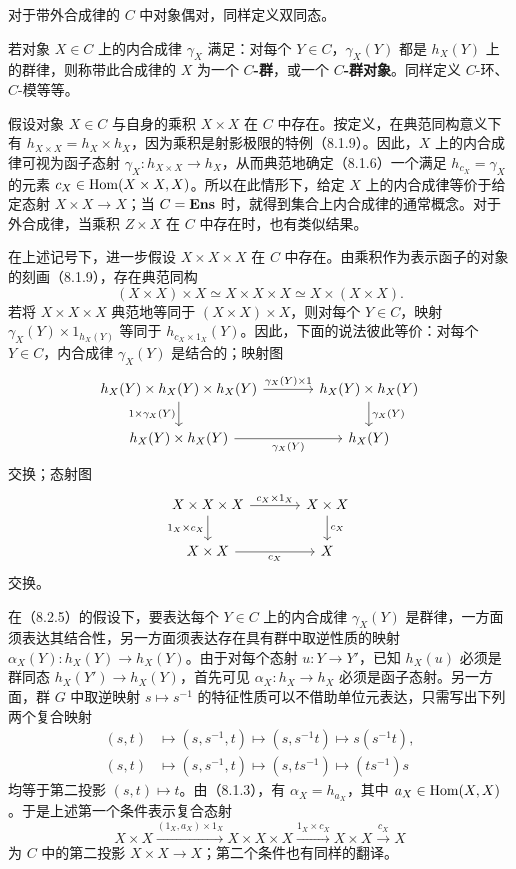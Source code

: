 对于带外合成律的 $C$ 中对象偶对，同样定义双同态。

若对象 $X\in C$ 上的内合成律 $\gamma_X$ 满足：对每个 $Y\in C$，$\gamma_X(Y)$ 都是 $h_X(Y)$ 上的群律，则称带此合成律的 $X$ 为一个 \textbf{$C$-群}，或一个 \textbf{$C$-群对象}。同样定义 $C$-环、$C$-模等等。

假设对象 $X\in C$ 与自身的乘积 $X\times X$ 在 $C$ 中存在。按定义，在典范同构意义下有 $h_{X\times X}=h_X\times h_X$，因为乘积是射影极限的特例（8.1.9）。因此，$X$ 上的内合成律可视为函子态射 $\gamma_X:h_{X\times X}\to h_X$，从而典范地确定（8.1.6）一个满足 $h_{c_X}=\gamma_X$ 的元素 $c_X\in\operatorname{Hom}(X\times X,X)$。所以在此情形下，给定 $X$ 上的内合成律等价于给定态射 $X\times X\to X$；当 $C=\mathbf{Ens}$ 时，就得到集合上内合成律的通常概念。对于外合成律，当乘积 $Z\times X$ 在 $C$ 中存在时，也有类似结果。

在上述记号下，进一步假设 $X\times X\times X$ 在 $C$ 中存在。由乘积作为表示函子的对象的刻画（8.1.9），存在典范同构
\[
(X\times X)\times X\simeq X\times X\times X\simeq X\times(X\times X).
\]
若将 $X\times X\times X$ 典范地等同于 $(X\times X)\times X$，则对每个 $Y\in C$，映射 $\gamma_X(Y)\times1_{h_X(Y)}$ 等同于 $h_{c_X\times1_X}(Y)$。因此，下面的说法彼此等价：对每个 $Y\in C$，内合成律 $\gamma_X(Y)$ 是结合的；映射图
\[
\begin{tikzcd}[column sep=large]
h_X(Y)\times h_X(Y)\times h_X(Y)\arrow[r,"\gamma_X(Y)\times1"]\arrow[d,"1\times\gamma_X(Y)"']&h_X(Y)\times h_X(Y)\arrow[d,"\gamma_X(Y)"]\\
h_X(Y)\times h_X(Y)\arrow[r,"\gamma_X(Y)"']&h_X(Y)
\end{tikzcd}
\]
交换；态射图
\[
\begin{tikzcd}[column sep=large]
X\times X\times X\arrow[r,"c_X\times1_X"]\arrow[d,"1_X\times c_X"']&X\times X\arrow[d,"c_X"]\\
X\times X\arrow[r,"c_X"']&X
\end{tikzcd}
\]
交换。

在（8.2.5）的假设下，要表达每个 $Y\in C$ 上的内合成律 $\gamma_X(Y)$ 是群律，一方面须表达其结合性，另一方面须表达存在具有群中取逆性质的映射 $\alpha_X(Y):h_X(Y)\to h_X(Y)$。由于对每个态射 $u:Y\to Y'$，已知 $h_X(u)$ 必须是群同态 $h_X(Y')\to h_X(Y)$，首先可见 $\alpha_X:h_X\to h_X$ 必须是函子态射。另一方面，群 $G$ 中取逆映射 $s\mapsto s^{-1}$ 的特征性质可以不借助单位元表达，只需写出下列两个复合映射
\[
\begin{aligned}
(s,t)&\longmapsto(s,s^{-1},t)\longmapsto(s,s^{-1}t)\longmapsto s(s^{-1}t),\\
(s,t)&\longmapsto(s,s^{-1},t)\longmapsto(s,ts^{-1})\longmapsto(ts^{-1})s
\end{aligned}
\]
均等于第二投影 $(s,t)\mapsto t$。由（8.1.3），有 $\alpha_X=h_{a_X}$，其中 $a_X\in\operatorname{Hom}(X,X)$。于是上述第一个条件表示复合态射
\[
X\times X\xrightarrow{(1_X,a_X)\times1_X}X\times X\times X
\xrightarrow{1_X\times c_X}X\times X\xrightarrow{c_X}X
\]
为 $C$ 中的第二投影 $X\times X\to X$；第二个条件也有同样的翻译。

